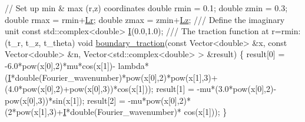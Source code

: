 \begin{DoxyCodeInclude}
 \textcolor{comment}{// Set up min & max (r,z) coordinates}
 \textcolor{keywordtype}{double} rmin = 0.1;
 \textcolor{keywordtype}{double} zmin = 0.3;
 \textcolor{keywordtype}{double} rmax = rmin+\hyperlink{namespaceGlobal__Parameters_a444f5c911c8805ad2ba45ed8b1b8904e}{Lr};
 \textcolor{keywordtype}{double} zmax = zmin+\hyperlink{namespaceGlobal__Parameters_a2bcf0bd846d839f1e3bb04a6c0a612c1}{Lz};
 \textcolor{comment}{}
\textcolor{comment}{ /// Define the imaginary unit}
\textcolor{comment}{} \textcolor{keyword}{const} std::complex<double> \hyperlink{namespaceGlobal__Parameters_a2ceef30cf51dfd432bafde39945a4e45}{I}(0.0,1.0);
\textcolor{comment}{}
\textcolor{comment}{ /// The traction function at r=rmin: (t\_r, t\_z, t\_theta)}
\textcolor{comment}{} \textcolor{keywordtype}{void} \hyperlink{namespaceGlobal__Parameters_a579fa434bf9ee57e66d4bd42b208fc23}{boundary\_traction}(\textcolor{keyword}{const} Vector<double> &x,
                      \textcolor{keyword}{const} Vector<double> &n,
                      Vector<std::complex<double> > &result)
 \{
  result[0] = -6.0*pow(x[0],2)*mu*cos(x[1])-
   lambda*(\hyperlink{namespaceGlobal__Parameters_a2ceef30cf51dfd432bafde39945a4e45}{I}*double(Fourier\_wavenumber)*pow(x[0],2)*pow(x[1],3)+
           (4.0*pow(x[0],2)+pow(x[0],3))*cos(x[1]));
  result[1] = -mu*(3.0*pow(x[0],2)-pow(x[0],3))*sin(x[1]);
  result[2] = -mu*pow(x[0],2)*(2*pow(x[1],3)+\hyperlink{namespaceGlobal__Parameters_a2ceef30cf51dfd432bafde39945a4e45}{I}*double(Fourier\_wavenumber)*
                               cos(x[1]));
 \}
 

\end{DoxyCodeInclude}
